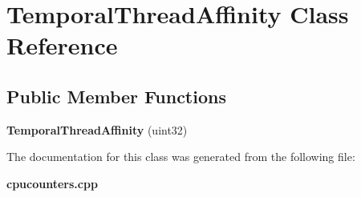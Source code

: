\section{Temporal\+Thread\+Affinity Class Reference}
\label{classTemporalThreadAffinity}
\subsection*{Public Member Functions}
\begin{DoxyCompactItemize}
\item 
{\bfseries Temporal\+Thread\+Affinity} (uint32)\label{classTemporalThreadAffinity_adc237efcc45938f0c188e705b2ed226e}

\end{DoxyCompactItemize}


The documentation for this class was generated from the following file\+:\begin{DoxyCompactItemize}
\item 
{\bf cpucounters.\+cpp}\end{DoxyCompactItemize}

